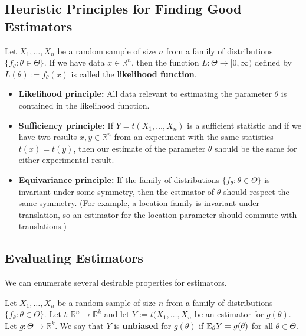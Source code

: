 \subsection{Heuristic Principles for Finding Good Estimators}

\begin{definition}Let \(X_1, \ldots, X_n\) be a random sample of size \(n\) from a family of distributions \(\{f_\theta: \theta \in \Theta\}\). If we have data \(x \in \mathbb{R}^n\), then the function \(L: \Theta \to [0, \infty)\) defined by \(L(\theta):= f_\theta(x)\) is called the \textbf{likelihood function}.

\end{definition}



\begin{itemize}

\item \textbf{Likelihood principle:} All data relevant to estimating the parameter \(\theta\) is contained in the likelihood function.

\item \textbf{Sufficiency principle:} If \(Y = t(X_1, \ldots, X_n)\) is a sufficient statistic and if we have two results \(x, y \in \mathbb{R}^n\) from an experiment with the same statistics \(t(x) = t(y)\), then our estimate of the parameter \(\theta\) should be the same for either experimental result.

\item \textbf{Equivariance principle:} If the family of distributions \(\{f_\theta: \theta \in \Theta\}\)  is invariant under some symmetry, then the estimator of \(\theta\) should respect the same symmetry. (For example, a location family is invariant under translation, so an estimator for the location parameter should commute with translations.)

\end{itemize}

\subsection{Evaluating Estimators}

We can enumerate several desirable properties for estimators.

\begin{definition}Let \(X_1, \ldots, X_n\) be a random sample of size \(n\) from a family of distributions \(\{f_\theta: \theta \in \Theta\}\). Let \(t: \mathbb{R}^n \to \mathbb{R}^k\) and let \(Y:= t(X_1, \ldots, X_n\) be an estimator for \(g(\theta)\). Let \(g:\Theta \to \mathbb{R}^k\). We say that \(Y\) is \textbf{unbiased} for \(g(\theta)\) if \(\E_\theta Y = g(\theta)\) for all \(\theta \in \Theta\).

\end{definition}

